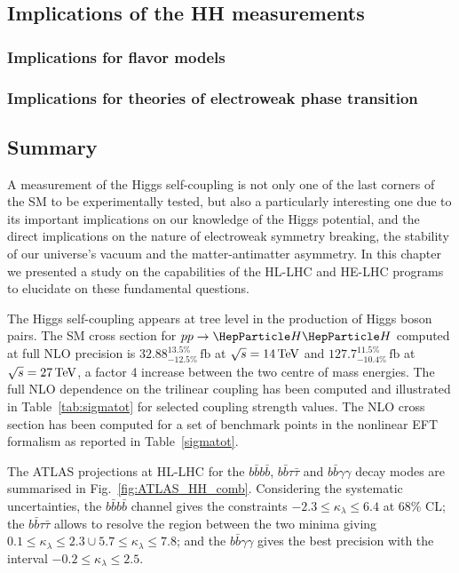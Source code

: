 \documentclass[../report.tex]{subfiles}
\providecommand{\main}{..}
\begin{document}
\subsection{Implications of the HH measurements}
\label{sec:HH_implications}

\subsubsection{Implications for flavor models}



\subsubsection{Implications for theories of electroweak phase transition}
\label{sec:HH_EWPT}




\subsection{Summary}

A measurement of the Higgs self-coupling is not only one of the last corners of the SM to be experimentally tested, but also a particularly interesting one due to its important implications on our knowledge of the Higgs potential, and the direct implications on the nature of electroweak symmetry breaking, the stability of our universe's vacuum and the matter-antimatter asymmetry. In this chapter we presented a study on the capabilities of the HL-LHC and HE-LHC programs to elucidate on these fundamental questions.

The Higgs self-coupling appears at tree level in the production of Higgs boson pairs. The SM cross section for $pp\to \HH$ computed at full NLO precision is $32.88^{13.5\%}_{-12.5\%}\,\text{fb}$ at $\sqrt{s}=14\,\text{\ensuremath{\text{TeV}}}$ and $127.7^{11.5\%}_{-10.4\%}\,\text{fb}$ at $\sqrt{s}=27\,\text{\ensuremath{\text{TeV}}}$, a factor 4 increase between the two centre of mass energies. The full NLO dependence on the trilinear coupling has been computed and illustrated in Table~\ref{tab:sigmatot} for selected coupling strength values. The NLO cross section has been computed for a set of benchmark points in the nonlinear EFT formalism as reported in Table~\ref{sigmatot}.

The ATLAS projections at HL-LHC for the $b\bar{b}b\bar{b}$, $b\bar{b}\tau\bar{\tau}$ and $b\bar{b}\gamma\gamma$ decay modes are summarised in Fig.~\ref{fig:ATLAS_HH_comb}. Considering the systematic uncertainties, the $b\bar{b}b\bar{b}$ channel gives the constraints $-2.3\leq \kappa_\lambda \leq 6.4$ at 68\% CL; the  $b\bar{b}\tau\bar{\tau}$ allows to resolve the region between the two minima giving $0.1\leq \kappa_\lambda\leq 2.3 \cup 5.7\leq \kappa_\lambda \leq 7.8$; and the $b\bar{b}\gamma\gamma$ gives the best precision with the interval $-0.2 \leq \kappa_\lambda \leq 2.5$.
\end{document}
